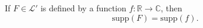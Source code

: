 If $F \in \mathcal{L}'$ is defined by a function $f: \mathbb{R} \to \mathbb{C}$, then
$$\text{supp}(F) = \text{supp}(f).$$
